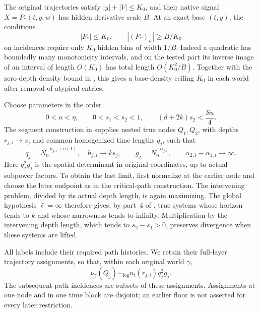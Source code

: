 The original trajectories satisfy \(|y|+|V|\le K_0\), and their native
signal \(X=P_*(t,y,w)\) has hidden derivative scale \(B\).  At an exact
base \((t,y)\), the conditions
\[
 |P_*|\le K_0,\qquad |(P_*)_w|\ge B/K_0
\]
on incidences require only \(K_0\) hidden bins of width \(1/B\).
Indeed a quadratic has boundedly many monotonicity intervals, and on
the tested part its inverse image of an interval of length \(O(K_0)\)
has total length \(O(K_0^2/B)\).  Together with the zero-depth density
bound in , this gives a base-density ceiling
\(K_0\) in each world after removal of atypical entries.

Choose parameters in the order
\begin{equation}
 \label{a08:depth-choice}
 0<u<\eta,\qquad 0<s_1<s_2<1,\qquad
 (d+2k)s_2<\frac{Su}{4}.
\end{equation}
The segment construction in  supplies nested
true nodes \(Q_1,Q_2\), with depths \(r_{j,i}\to s_j\) and common
homogenized time lengths \(q_j\), such that
\begin{equation}
 \label{a08:two-node-scales}
 q_j=N_0^{-h_{j,i}+o(1)},\quad h_{j,i}\to ks_j,\qquad
 g_j=N_0^{-\alpha_{j,i}},\qquad
 \alpha_{2,i}-\alpha_{1,i}\longrightarrow\infty.
\end{equation}
Here \(q_j^2g_j\) is the spatial determinant in original coordinates,
up to actual subpower factors.  To obtain the last limit, first normalize
at the earlier node and choose the later endpoint as in the critical-path
construction.  The intervening problem, divided by its actual depth
length, is again maximizing.  The global hypothesis \(\ell=\infty\)
therefore gives, by part~4 of , true systems
whose horizon tends to \(k\) and whose narrowness tends to infinity.
Multiplication by the intervening depth length, which tends
to \(s_2-s_1>0\), preserves divergence when these systems are lifted.

All labels include their required path histories.  We retain their
full-layer trajectory assignments, so that, within each original world
\(\gamma\),
\begin{equation}
 \label{a08:old-layer-masses}
 \nu_\gamma(Q_j)\sim_{\log}
 n_i(r_{j,i})q_j^2g_j.
\end{equation}
The subsequent path incidences are subsets of these assignments.
Assignments at one node and in one time block are disjoint; an earlier
floor is not asserted for every later restriction.

